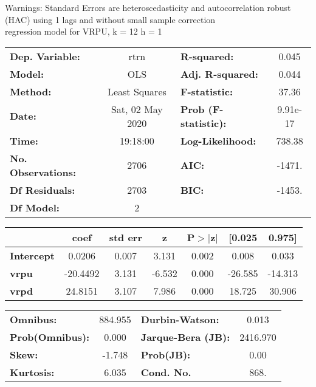Warnings: \newline
 [1] Standard Errors are heteroscedasticity and autocorrelation robust (HAC) using 1 lags and without small sample correction\\ 

regression model for VRPU, k = 12 h = 1\begin{center}
\begin{tabular}{lclc}
\toprule
\textbf{Dep. Variable:}    &       rtrn       & \textbf{  R-squared:         } &     0.045   \\
\textbf{Model:}            &       OLS        & \textbf{  Adj. R-squared:    } &     0.044   \\
\textbf{Method:}           &  Least Squares   & \textbf{  F-statistic:       } &     37.36   \\
\textbf{Date:}             & Sat, 02 May 2020 & \textbf{  Prob (F-statistic):} &  9.91e-17   \\
\textbf{Time:}             &     19:18:00     & \textbf{  Log-Likelihood:    } &    738.38   \\
\textbf{No. Observations:} &        2706      & \textbf{  AIC:               } &    -1471.   \\
\textbf{Df Residuals:}     &        2703      & \textbf{  BIC:               } &    -1453.   \\
\textbf{Df Model:}         &           2      & \textbf{                     } &             \\
\bottomrule
\end{tabular}
\begin{tabular}{lcccccc}
                   & \textbf{coef} & \textbf{std err} & \textbf{z} & \textbf{P$> |$z$|$} & \textbf{[0.025} & \textbf{0.975]}  \\
\midrule
\textbf{Intercept} &       0.0206  &        0.007     &     3.131  &         0.002        &        0.008    &        0.033     \\
\textbf{vrpu}      &     -20.4492  &        3.131     &    -6.532  &         0.000        &      -26.585    &      -14.313     \\
\textbf{vrpd}      &      24.8151  &        3.107     &     7.986  &         0.000        &       18.725    &       30.906     \\
\bottomrule
\end{tabular}
\begin{tabular}{lclc}
\textbf{Omnibus:}       & 884.955 & \textbf{  Durbin-Watson:     } &    0.013  \\
\textbf{Prob(Omnibus):} &   0.000 & \textbf{  Jarque-Bera (JB):  } & 2416.970  \\
\textbf{Skew:}          &  -1.748 & \textbf{  Prob(JB):          } &     0.00  \\
\textbf{Kurtosis:}      &   6.035 & \textbf{  Cond. No.          } &     868.  \\
\bottomrule
\end{tabular}
\end{center}

